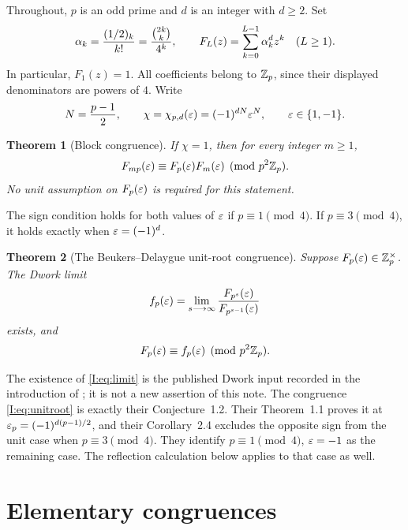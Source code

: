 \documentclass[11pt,letterpaper]{article}
\newtheorem{theorem}{Theorem}[section]
\theoremstyle{definition}
\theoremstyle{remark}
\begin{document}
Throughout, $p$ is an odd prime and $d$ is an integer with $d\ge2$.
Set
\[
 \alpha_k=\frac{(1/2)_k}{k!}=\frac{\binom{2k}{k}}{4^k},\qquad
 F_L(z)=\sum_{k=0}^{L-1}\alpha_k^d z^k\quad(L\ge1).
\]
In particular, $F_1(z)=1$.  All coefficients belong to $\mathbb Z_p$, since
their displayed denominators are powers of $4$.
Write
\begin{equation}\label{I:eq:sign}
 N=\frac{p-1}{2},\qquad
 \chi=\chi_{p,d}(\varepsilon)=(-1)^{dN}\varepsilon^N,
 \qquad \varepsilon\in\{1,-1\}.
\end{equation}

\begin{theorem}[Block congruence]\label{I:thm:block}
If $\chi=1$, then for every integer $m\ge1$,
\begin{equation}\label{I:eq:block}
 F_{mp}(\varepsilon)\equiv F_p(\varepsilon)F_m(\varepsilon)\pmod{p^2\mathbb Z_p}.
\end{equation}
No unit assumption on $F_p(\varepsilon)$ is required for this statement.
\end{theorem}

The sign condition holds for both values of $\varepsilon$ if
$p\equiv1\pmod4$.  If $p\equiv3\pmod4$, it holds exactly when
$\varepsilon=(-1)^d$.

\begin{theorem}[The Beukers--Delaygue unit-root congruence]\label{I:thm:unitroot}
Suppose $F_p(\varepsilon)\in\mathbb Z_p^\times$.  The Dwork limit
\begin{equation}\label{I:eq:limit}
 f_p(\varepsilon)=\lim_{s\longrightarrow\infty}
       \frac{F_{p^s}(\varepsilon)}{F_{p^{s-1}}(\varepsilon)}
\end{equation}
exists, and
\begin{equation}\label{I:eq:unitroot}
 F_p(\varepsilon)\equiv f_p(\varepsilon)\pmod{p^2\mathbb Z_p}.
\end{equation}
\end{theorem}

The existence of \eqref{I:eq:limit} is the published Dwork input recorded
in the introduction of \cite{I:BD}; it is not a new assertion of this
note.  The congruence \eqref{I:eq:unitroot} is exactly their
Conjecture~1.2.  Their Theorem~1.1 proves it at
$\varepsilon_p=(-1)^{d(p-1)/2}$, and their Corollary~2.4 excludes the opposite
sign from the unit case when $p\equiv3\pmod4$.
They identify $p\equiv1\pmod4$, $\varepsilon=-1$ as the remaining case.
The reflection calculation below applies to that case as well.

\section{Elementary congruences}
\end{document}
